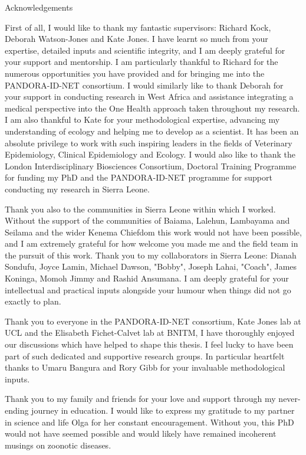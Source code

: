 \newpage

\Large

Acknowledgements

\normalsize

First of all, I would like to thank my fantastic supervisors: Richard Kock, Deborah Watson-Jones and Kate Jones. I have learnt so much from your expertise, detailed inputs and scientific integrity, and I am deeply grateful for your support and mentorship. I am particularly thankful to Richard for the numerous opportunities you have provided and for bringing me into the PANDORA-ID-NET consortium. I would similarly like to thank Deborah for your support in conducting research in West Africa and assistance integrating a medical perspective into the One Health approach taken throughout my research. I am also thankful to  Kate for your methodological expertise, advancing my understanding of ecology and helping me to develop as a scientist. It has been an absolute privilege to work with such inspiring leaders in the fields of Veterinary Epidemiology, Clinical Epidemiology and Ecology. I would also like to thank the London Interdisciplinary Biosciences Consortium, Doctoral Training Programme for funding my PhD and the PANDORA-ID-NET programme for support conducting my research in Sierra Leone.
\par
Thank you also to the communities in Sierra Leone within which I worked. Without the support of the communities of Baiama, Lalehun, Lambayama and Seilama and the wider Kenema Chiefdom this work would not have been possible, and I am extremely grateful for how welcome you made me and the field team in the pursuit of this work. Thank you to my collaborators in Sierra Leone: Dianah Sondufu, Joyce Lamin, Michael Dawson, "Bobby", Joseph Lahai, "Coach", James Koninga, Momoh Jimmy and Rashid Ansumana. I am deeply grateful for your intellectual and practical inputs alongside your humour when things did not go exactly to plan.
\par
Thank you to everyone in the PANDORA-ID-NET consortium, Kate Jones lab at UCL and the Elisabeth Fichet-Calvet lab at BNITM, I have thoroughly enjoyed our discussions which have helped to shape this thesis. I feel lucky to have been part of such dedicated and supportive research groups. In particular heartfelt thanks to Umaru Bangura and Rory Gibb for your invaluable methodological inputs.
\par
Thank you to my family and friends for your love and support through my never-ending journey in education. I would like to express my gratitude to my partner in science and life Olga for her constant encouragement. Without you, this PhD would not have seemed possible and would likely have remained incoherent musings on zoonotic diseases.

\newpage